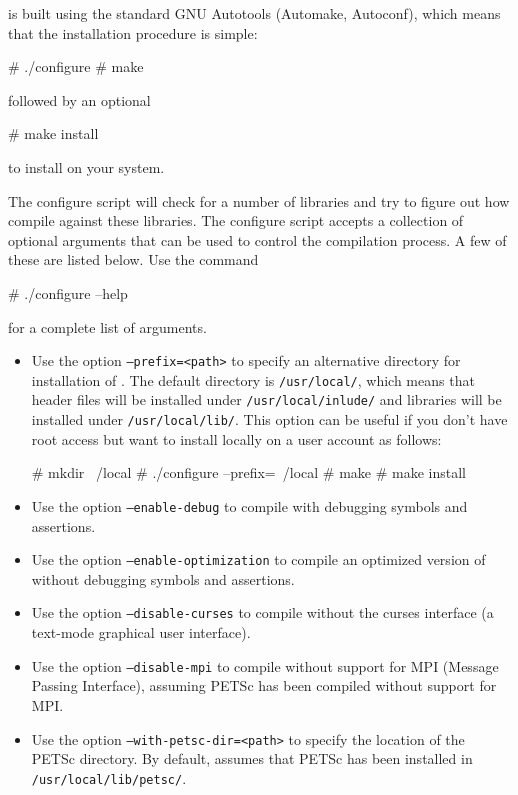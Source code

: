 \dolfin{} is built using the standard GNU Autotools (Automake,
Autoconf), which means that the installation procedure is simple:
\begin{code}
  # ./configure
  # make
\end{code}
followed by an optional
\begin{code}
  # make install
\end{code}
to install \dolfin{} on your system.

The configure script will check for a number of libraries and try
to figure out how compile \dolfin{} against these libraries. The
configure script accepts a collection of optional arguments that can be
used to control the compilation process. A few of these are listed
below. Use the command
\begin{code}
  # ./configure --help
\end{code}
for a complete list of arguments.

\begin{itemize}
\item
  Use the option \texttt{--prefix=<path>} to specify an alternative
  directory for installation of \dolfin{}. The default directory is
  \texttt{/usr/local/}, which means that header files will be
  installed under \texttt{/usr/local/inlude/} and libraries will be
  installed under \texttt{/usr/local/lib/}. This option can be useful
  if you don't have root access but want to install \dolfin{} locally
  on a user account as follows:
  \begin{code}
    # mkdir ~/local
    # ./configure --prefix=~/local
    # make
    # make install
  \end{code}
\item
  Use the option \texttt{--enable-debug} to compile \dolfin{} with
  debugging symbols and assertions.
\item
  Use the option \texttt{--enable-optimization} to compile an
  optimized version of \dolfin{} without debugging symbols
  and assertions.
\item
  Use the option \texttt{--disable-curses} to compile \dolfin{}
  without the curses interface (a text-mode graphical user interface).
\item
  Use the option \texttt{--disable-mpi} to compile \dolfin{} without
  support for MPI (Message Passing Interface), assuming PETSc has been
  compiled without support for MPI.
\item
  Use the option \texttt{--with-petsc-dir=<path>} to specify the
  location of the PETSc directory. By default, \dolfin{} assumes that
  PETSc has been installed in \texttt{/usr/local/lib/petsc/}.
\end{itemize}

